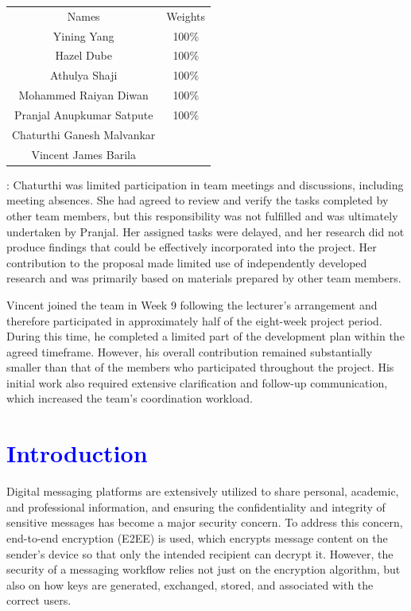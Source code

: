 \documentclass[11pt]{article}
\newcommand{\tb}{\textcolor{blue}}
\begin{document}
\begin{center}
\begin{tabular}{cc}\hline
Names & Weights \\
Yining Yang &  100$\%$ \\
Hazel Dube &  100$\%$ \\
Athulya Shaji &  100$\%$ \\
Mohammed Raiyan Diwan &  100$\%$ \\
Pranjal Anupkumar Satpute &  100$\%$ \\
Chaturthi Ganesh Malvankar &   \\
Vincent James Barila &   \\  \hline
\end{tabular}
\end{center}

: Chaturthi was limited participation in team meetings and discussions, including meeting absences. She had agreed to review and verify the tasks completed by other team members, but this responsibility was not fulfilled and was ultimately undertaken by Pranjal. Her assigned tasks were delayed, and her research did not produce findings that could be effectively incorporated into the project. Her contribution to the proposal made limited use of independently developed research and was primarily based on materials prepared by other team members.

Vincent joined the team in Week 9 following the lecturer’s arrangement and therefore participated in approximately half of the eight-week project period. During this time, he completed a limited part of the development plan within the agreed timeframe. However, his overall contribution remained substantially smaller than that of the members who participated throughout the project. His initial work also required extensive clarification and follow-up communication, which increased the team’s coordination workload.

\newpage

\section{\tb{Introduction}}

Digital messaging platforms are extensively utilized to share personal, academic, and professional information, and ensuring the confidentiality and integrity of sensitive messages has become a major security concern. To address this concern, end-to-end encryption (E2EE) is used, which encrypts message content on the sender’s device so that only the intended recipient can decrypt it. However, the security of a messaging workflow relies not just on the encryption algorithm, but also on how keys are generated, exchanged, stored, and associated with the correct users.
\end{document}
